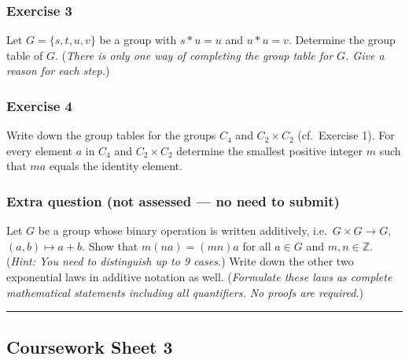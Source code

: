 \documentclass[
  12pt,
  a4paper,
  twoside]{article}
\theoremstyle{plain}
\theoremstyle{definition}
\begin{document}
\hypertarget{exercise-3-1}{%
\subsubsection*{Exercise 3}\label{exercise-3-1}}

Let \(G=\{s,t,u,v\}\) be a group with \(s\ast u = u\) and \(u\ast u = v\).
Determine the group table of \(G\). (\emph{There is only one way of completing
the group table for \(G\). Give a reason for each step.})

\hypertarget{exercise-4}{%
\subsubsection*{Exercise 4}\label{exercise-4}}

Write down the group tables for the groups \(C_4\) and \(C_2 \times C_2\) (cf.~Exercise 1). For every element \(a\) in \(C_4\)
and \(C_2 \times C_2\) determine the smallest positive integer
\(m\) such that \(ma\) equals the identity element.

\hypertarget{extra-question-not-assessed-no-need-to-submit}{%
\subsubsection*{Extra question (not assessed --- no need to submit)}\label{extra-question-not-assessed-no-need-to-submit}}

Let \(G\) be a group whose binary operation is written additively,
i.e.~\(G \times G \to G\), \((a,b) \mapsto a+b\). Show that \(m(n a) = (m n) a\) for all \(a \in G\) and \(m,n \in \mathbb{Z}\). (\emph{Hint: You need to
distinguish up to 9 cases.}) Write down the other two
exponential laws in additive notation as well. (\emph{Formulate
these laws as complete mathematical statements including all
quantifiers. No proofs are required.})

\begin{center}\rule{0.5\linewidth}{0.5pt}\end{center}

\hypertarget{coursework-sheet-3}{%
\subsection{Coursework Sheet 3}\label{coursework-sheet-3}}
\end{document}
